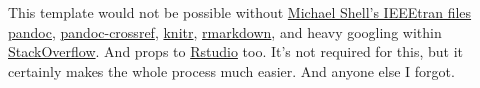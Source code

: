 \documentclass[a4paper,conference]{IEEEtran}
\begin{document}
This template would not be possible without
\href{https://www.ctan.org/tex-archive/macros/latex/contrib/IEEEtran/?lang=en}{Michael
Shell's IEEEtran files} \href{http://pandoc.org/}{pandoc},
\href{https://github.com/lierdakil/pandoc-crossref}{pandoc-crossref},
\href{http://yihui.name/knitr/}{knitr},
\href{http://rmarkdown.rstudio.com/}{rmarkdown}, and heavy googling
within \href{http://stackoverflow.com/}{StackOverflow}. And props to
\href{https://www.rstudio.com/}{Rstudio} too. It's not required for
this, but it certainly makes the whole process much easier. And anyone
else I forgot.


\end{document}

